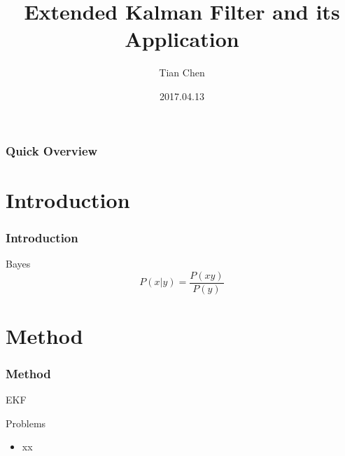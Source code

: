 \documentclass[14pt,hyperref={CJKbookmarks=true}]{beamer}
\theoremstyle{plain}
\theoremstyle{definition}
\theoremstyle{remark}
\begin{document}
\title[IACAS]{Extended Kalman Filter and its Application}
\author{Tian Chen}
\date[]{2017.04.13}
\begin{frame}
\titlepage
\end{frame}


\begin{frame}
\frametitle{Quick Overview}
\large\tableofcontents
\end{frame}

\section{Introduction}
\begin{frame}
\frametitle{Introduction}
\small
\begin{block}{Bayes}
\begin{equation}
  P(x|y) =\frac{P(xy)}{P(y)}
\end{equation}

\end{block}


\end{frame}
\begin{frame}

\end{frame}


\section{Method}

\begin{frame}
\small
\frametitle{Method}{EKF}
\begin{block}{Problems}
\begin{itemize}
\item xx
\end{itemize}
\end{block}
\end{frame}
\end{document}
